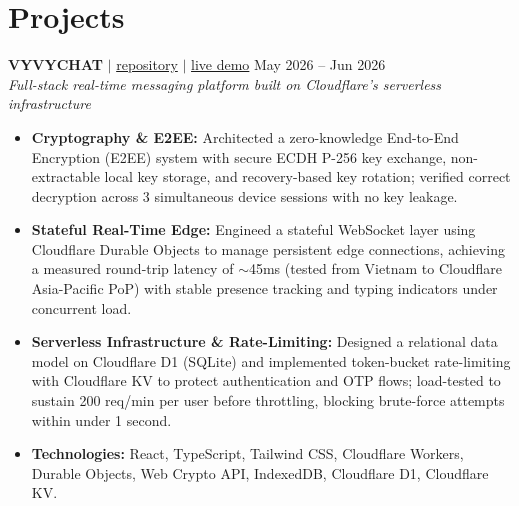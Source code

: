 \documentclass[10pt,a4paper]{article}
\begin{document}
\section*{Projects}

\noindent \textbf{VYVYCHAT} $|$ \href{https://github.com/vyquochuy/vyvychat}{repository} $|$ \href{https://vyvychat.myvault-service.workers.dev/}{live demo} \hfill May 2026 -- Jun 2026\\
\textit{Full-stack real-time messaging platform built on Cloudflare's serverless infrastructure}
\begin{itemize}[leftmargin=0.25in, nosep]
    \item \textbf{Cryptography \& E2EE:} Architected a zero-knowledge End-to-End Encryption (E2EE) system with secure ECDH P-256 key exchange, non-extractable local key storage, and recovery-based key rotation; verified correct decryption across 3 simultaneous device sessions with no key leakage.
    \item \textbf{Stateful Real-Time Edge:} Engineed a stateful WebSocket layer using Cloudflare Durable Objects to manage persistent edge connections, achieving a measured round-trip latency of $\sim$45ms (tested from Vietnam to Cloudflare Asia-Pacific PoP) with stable presence tracking and typing indicators under concurrent load.
    \item \textbf{Serverless Infrastructure \& Rate-Limiting:} Designed a relational data model on Cloudflare D1 (SQLite) and implemented token-bucket rate-limiting with Cloudflare KV to protect authentication and OTP flows; load-tested to sustain 200 req/min per user before throttling, blocking brute-force attempts within under 1 second.
    \item \textbf{Technologies:} React, TypeScript, Tailwind CSS, Cloudflare Workers, Durable Objects, Web Crypto API, IndexedDB, Cloudflare D1, Cloudflare KV.
\end{itemize}
\vspace{10pt}
\end{document}
